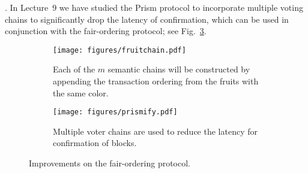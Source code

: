 \documentclass{article}
\begin{document}
. In Lecture~9 we have studied the {\sf Prism} protocol to incorporate multiple voting chains to significantly drop the latency of confirmation, which can be used in conjunction with the  fair-ordering protocol;  see Fig.~\ref{fig:prismify}.  %





\begin{figure}
    \centering
     \begin{subfigure}[b]{0.85\textwidth}
         \centering
         \texttt{[image: figures/fruitchain.pdf]}
         \caption{Each of the $m$ semantic chains will be constructed by appending the transaction ordering from the fruits with the same color.}
         \label{fig:fruitchain}
     \end{subfigure}
     \hfill
     \begin{subfigure}[b]{0.85\textwidth}
         \centering
         \texttt{[image: figures/prismify.pdf]}
         \caption{Multiple voter chains are used to reduce the latency for confirmation of blocks.}
         \label{fig:prismify}
     \end{subfigure}
     \caption{Improvements on the fair-ordering protocol.}
\end{figure}
\end{document}

